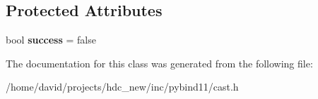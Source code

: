 \subsection*{Protected Attributes}
\begin{DoxyCompactItemize}
\item 
bool {\bfseries success} = false\hypertarget{classtype__caster_3_01std_1_1string_01_4_a98c9e9b1f5f26239c8db9188ed159016}{}\label{classtype__caster_3_01std_1_1string_01_4_a98c9e9b1f5f26239c8db9188ed159016}

\end{DoxyCompactItemize}


The documentation for this class was generated from the following file\+:\begin{DoxyCompactItemize}
\item 
/home/david/projects/hdc\+\_\+new/inc/pybind11/cast.\+h\end{DoxyCompactItemize}
